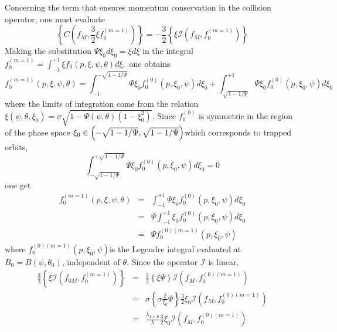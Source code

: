 Concerning the term that ensures momentum conservation in the collision
operator, one must evaluate
\begin{equation}
\left\{ C\left( f_{M},\frac{3}{2}\xi f_{0}^{\left( m=1\right) }\right)
\right\} =-\frac{3}{2}\left\{ \xi \mathcal{I}\left( f_{M},f_{0}^{\left(
m=1\right) }\right) \right\}
\end{equation}
Making the substitution $\Psi \xi _{0}d\xi _{0}=\xi d\xi $ in the integral $%
f_{0}^{\left( m=1\right) }=\int_{-1}^{+1}\xi f_{0}\left( p,\xi ,\psi ,\theta
\right) d\xi ,$ one obtains
\begin{equation}
f_{0}^{\left( m=1\right) }\left( p,\xi ,\psi ,\theta \right) =\int_{-1}^{-%
\sqrt{1-1/\Psi }}\Psi \xi _{0}f_{0}^{\left( 0\right) }\left( p,\xi _{0},\psi
\right) d\xi _{0}+\int_{\sqrt{1-1/\Psi }}^{+1}\Psi \xi _{0}f_{0}^{\left(
0\right) }\left( p,\xi _{0},\psi \right) d\xi _{0}
\end{equation}
where the limits of integration come from the relation $\xi \left( \psi
,\theta ,\xi _{0}\right) =\sigma \sqrt{1-\Psi \left( \psi ,\theta \right)
\left( 1-\xi _{0}^{2}\right) }.$ Since $f_{0}^{\left( 0\right) }$ is
symmetric in the region of the phase space $\xi _{0}\in \left( -\sqrt{%
1-1/\Psi },\sqrt{1-1/\Psi }\right) $which corresponds to trapped orbits,
\begin{equation}
\int_{-\sqrt{1-1/\Psi }}^{+\sqrt{1-1/\Psi }}\Psi \xi _{0}f_{0}^{\left(
0\right) }\left( p,\xi _{0},\psi \right) d\xi _{0}=0
\end{equation}
one get
\begin{eqnarray}
f_{0}^{\left( m=1\right) }\left( p,\xi ,\psi ,\theta \right)
&=&\int_{-1}^{+1}\Psi \xi _{0}f_{0}^{\left( 0\right) }\left( p,\xi _{0},\psi
\right) d\xi _{0}  \nonumber \\
&=&\Psi \int_{-1}^{+1}\xi _{0}f_{0}^{\left( 0\right) }\left( p,\xi _{0},\psi
\right) d\xi _{0}  \nonumber \\
&=&\Psi f_{0}^{\left( 0\right) \left( m=1\right) }\left( p,\xi _{0},\psi
\right)
\end{eqnarray}
where $f_{0}^{\left( 0\right) \left( m=1\right) }\left( p,\xi _{0},\psi
\right) $is the Legendre integral evaluated at $B_{0}=B\left( \psi ,\theta
_{0}\right) $, independent of $\theta .$ Since the operator $\mathcal{I}$ is
linear,
\begin{eqnarray}
\frac{3}{2}\left\{ \xi \mathcal{I}\left( f_{0M},f_{0}^{\left( m=1\right)
}\right) \right\} &=&\frac{3}{2}\left\{ \xi \Psi \right\} \mathcal{I}\left(
f_{M},f_{0}^{\left( 0\right) \left( m=1\right) }\right)  \nonumber \\
&=&\sigma \left\{ \sigma \frac{\xi }{\xi _{0}}\Psi \right\} \frac{3}{2}\xi
_{0}\mathcal{I}\left( f_{M},f_{0}^{\left( 0\right) \left( m=1\right) }\right)
\nonumber \\
&=&\frac{\overline{\lambda }_{1,1,0}}{\lambda }\frac{3}{2}\xi _{0}\mathcal{I}%
\left( f_{M},f_{0}^{\left( 0\right) \left( m=1\right) }\right)
\end{eqnarray}
